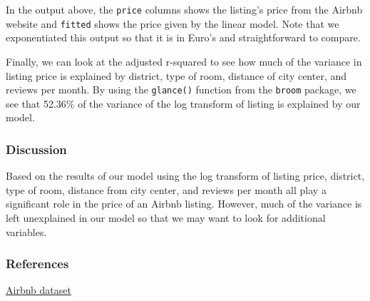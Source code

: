 \documentclass[]{article}
\begin{document}
In the output above, the \texttt{price} columns shows the listing's
price from the Airbnb website and \texttt{fitted} shows the price given
by the linear model. Note that we exponentiated this output so that it
is in Euro's and straightforward to compare.

Finally, we can look at the adjusted r-squared to see how much of the
variance in listing price is explained by district, type of room,
distance of city center, and reviews per month. By using the
\texttt{glance()} function from the \texttt{broom} package, we see that
52.36\% of the variance of the log transform of listing is explained by
our model.

\hypertarget{discussion}{%
\subsubsection{Discussion}\label{discussion}}

Based on the results of our model using the log transform of listing
price, district, type of room, distance from city center, and reviews
per month all play a significant role in the price of an Airbnb listing.
However, much of the variance is left unexplained in our model so that
we may want to look for additional variables.

\hypertarget{references}{%
\subsubsection{References}\label{references}}

\href{http://insideairbnb.com/get-the-data.html}{Airbnb dataset}
\end{document}
